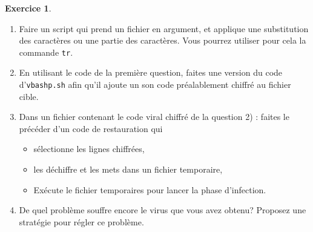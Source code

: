 \documentclass[a4paper,11pt]{article}
\theoremstyle{plain}
\theoremstyle{definition}
\newtheorem{exercice}{Exercice}
\begin{document}

\begin{exercice}

\begin{enumerate}
\item Faire un script qui prend un fichier en argument, et applique une substitution des caractères ou une partie des caractères.
Vous pourrez utiliser pour cela la commande \texttt{tr}.
\item En utilisant le code de la première question, faites une version du code d'\texttt{vbashp.sh} afin qu'il ajoute un son code préalablement chiffré au  fichier cible.
\item Dans un fichier contenant le code viral chiffré de la question 2) : faites le précéder d'un code de restauration qui
\begin{itemize}
\item sélectionne les lignes chiffrées,
\item les déchiffre et les mets dans un fichier temporaire,
\item Exécute le fichier temporaires pour lancer la phase d'infection.
\end{itemize}
\item De quel problème souffre encore le virus que vous avez obtenu? Proposez une stratégie pour régler ce problème.
\end{enumerate}

\end{exercice}
\end{document}
